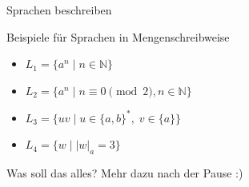 \begin{frame}[fragile]{Sprachen beschreiben}
    \begin{exampleblock}{Beispiele für Sprachen in Mengenschreibweise}
    \begin{itemize}
        \item $L_1 = \{a^n\;|\;n\in\mathbb{N}\}$
        \item $L_2 = \{a^n\;|\;n \equiv 0 \pmod 2, n\in\mathbb{N}\}$
        \item $L_3 = \{uv\;|\;u\in\{a,b\}^\ast,\;v\in\{a\}\}$
        \item $L_4 = \{w\;|\;|w|_a = 3\}$
    \end{itemize}
    \end{exampleblock}
    Was soll das alles? Mehr dazu nach der Pause :)
\end{frame}
